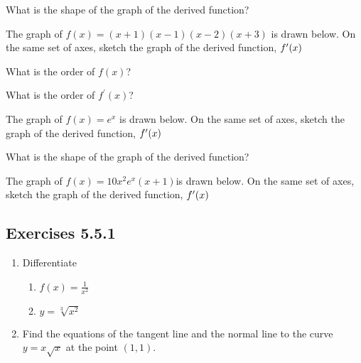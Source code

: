 What is the shape of the graph of the derived function? 

The graph of $f (x) =(x +1) (x -1) (x -2) (x +3)$ is drawn below. On the same set of axes, sketch the graph of the derived function, $f^{ \prime } (x)\vspace{+0.500000cm}$ 


\setlength\fboxrule{0.01in}\setlength\fboxsep{0.2in}
\vspace{0.5cm}\vspace{0.5cm} 

What
is the order of $f (x)$? \vspace{0.5cm} 

What is the order of $f^{ \prime } (x)$?\vspace{0.5cm} 

The
graph of $f (x) =e^{x}$ is drawn below. On the same set of axes, sketch the graph of the derived function, $f^{ \prime } (x)\vspace{+0.500000cm}$ 


\setlength\fboxrule{0.01in}\setlength\fboxsep{0.2in}
\vspace{0.5cm} 

What is the shape of the graph of the derived function?\vspace{1cm}


The graph of $f (x) =10 x^{2} e^{x} (x +1)$is drawn below. On the same set of axes, sketch the graph of the derived function, $f^{ \prime } (x)\vspace{+0.500000cm}$ 


\setlength\fboxrule{0.01in}\setlength\fboxsep{0.2in}


\subsection{Exercises 5.5.1}
\begin{enumerate}
	\item Differentiate 
	
	
	\begin{enumerate}
		\item $f (x) =\frac{1}{x^{2}}$ 
		
		\item $y =\sqrt[{3}]{x^{2}}$ \end{enumerate}
	
	\item Find the equations of the
	tangent line and the normal line to the curve $y =x \sqrt{x}$ at the point $(1 ,1)$. \end{enumerate}


